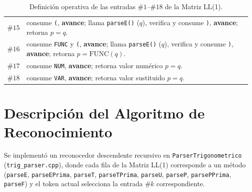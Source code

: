 \documentclass[10pt,a4paper]{article}
\begin{document}
\begin{table}[H]
\begin{tabular}{rl}
$\#15$ & consume \texttt{(}, \textbf{avance}; llama \texttt{parseE()} ($q$), verifica y consume \texttt{)}, \textbf{avance}; retorna $p=q$. \\
$\#16$ & consume \texttt{FUNC} y \texttt{(}, \textbf{avance}; llama \texttt{parseE()} ($q$), verifica y consume \texttt{)}, \textbf{avance}; retorna $p=\text{FUNC}(q)$. \\
$\#17$ & consume \texttt{NUM}, \textbf{avance}; retorna valor numérico $p=q$. \\
$\#18$ & consume \texttt{VAR}, \textbf{avance}; retorna valor sustituido $p=q$. \\
\bottomrule
\end{tabular}
\caption{Definición operativa de las entradas $\#1\text{--}\#18$ de la Matriz LL(1).}
\end{table}

\section{Descripción del Algoritmo de Reconocimiento}
Se implementó un reconocedor descendente recursivo en \texttt{ParserTrigonometrico} (\texttt{trig\_parser.cpp}), donde cada fila de la Matriz LL(1) corresponde a un método (\texttt{parseE}, \texttt{parseEPrima}, \texttt{parseT}, \texttt{parseTPrima}, \texttt{parseU}, \texttt{parseP}, \texttt{parsePPrima}, \texttt{parseF}) y el token actual selecciona la entrada $\#k$ correspondiente.
\end{document}
